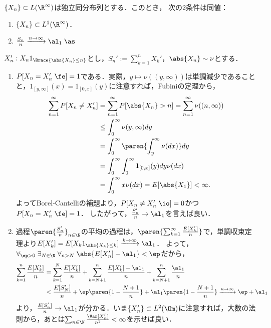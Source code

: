 \documentclass[uplatex,dvipdfmx]{jsreport}
\begin{document}
\begin{corollary}[独立分布の場合の必要十分条件]
    $\{X_n\}\subset L(\R^\infty)$は独立同分布列とする．このとき，
    次の2条件は同値：
    \begin{enumerate}
        \item $\{X_n\}\subset L^1(\R^\infty)$．
        \item $\frac{S_n}{n}\xrightarrow{n\to\infty}\al_1\;\as$
    \end{enumerate}
\end{corollary}
\begin{Proof}
    $X_n':X_n1_{\Brace{\abs{X_n}\le n}}$とし，$S_n':=\sum^n_{k=1}X_k'$，$\abs{X_n}\sim\nu$とする．
    \begin{enumerate}
        \item $P[X_n=X_n'\;\fe]=1$である．実際，$y\mapsto\nu((y,\infty))$は単調減少であることと，$1_{[y,\infty]}(x)=1_{[0,x]}(y)$に注意すれば，Fubiniの定理から，
        \begin{align*}
            \sum^\infty_{n=1}P[X_n\ne X_n']&=\sum^\infty_{n=1}P[\abs{X_n}>n]=\sum^\infty_{n=1}\nu((n,\infty))\\
            &\le\int^\infty_{0}\nu(y,\infty)dy\\
            &=\int^\infty_0\paren{\int^\infty_y\nu(dx)}dy\\
            &=\int^\infty_0\int^\infty_01_{[0,x]}(y)dy\nu(dx)\\
            &=\int^\infty_0x\nu(dx)=E[\abs{X_1}]<\infty.
        \end{align*}
        よってBorel-Cantelliの補題より，$P[X_n\ne X_n'\;\io]=0$かつ$P[X_n=X_n'\;\fe]=1$．
        したがって，$\frac{S_n'}{n}\to\al_1$を言えば良い．
        \item 過程$\paren{\frac{S_n'}{n}}_{n\in\N}$の平均の過程は，$\paren{\sum^\infty_{k=1}\frac{E[X_k']}{n}}$で，単調収束定理より$E[X_k']=E[X_k1_{\abs{X_k}\le k}]\xrightarrow{k\to\infty}\al_1$．
        よって，$\forall_{\ep>0}\;\exists_{N\in\N}\;\forall_{n>N}\;\abs{E[X_n']-\al_1}<\ep$だから，
        \begin{align*}
            \sum^n_{k=1}\frac{E[X_k']}{n}&=\sum^N_{k=1}\frac{E[X_k']}{n}+\sum^n_{k=N+1}\frac{E[X_k']-\al_1}{n}+\sum_{k=N+1}^n\frac{\al_1}{n}\\
            &<\frac{E[S_N']}{n}+\ep\paren{1-\frac{N+1}{n}}+\al_1\paren{1-\frac{N+1}{n}}\xrightarrow{n\to\infty}\ep+\al_1
        \end{align*}
        より，$\frac{E[S_n']}{n}\to\al_1$が分かる．いま$\{X_n'\}\subset L^2(\Om)$に注意すれば，大数の法則から，あとは$\sum_{n\in\N}\frac{\Var[X_n']}{n^2}<\infty$を示せば良い．

\end{enumerate}
\end{Proof}
\end{document}
